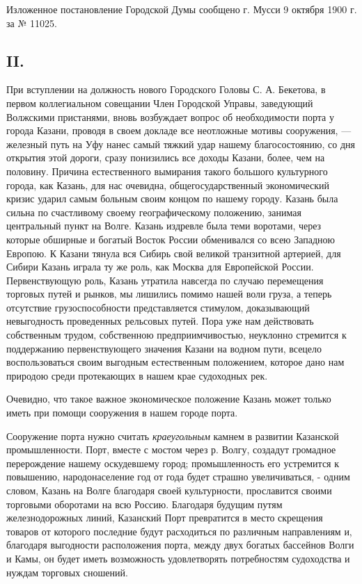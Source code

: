 \documentclass[oneside,final,14pt]{extreport}
\begin{document}
	Изложенное постановление Городской Думы сообщено г. Мусси 9 октября 1900 г. за № 11025.
	
	{%
		\centering
		\subsection*{II.}
	}
	При вступлении на должность нового Городского Головы С. А. Бекетова, в первом коллегиальном совещании Член Городской Управы, заведующий Волжскими пристанями, вновь возбуждает вопрос об необходимости порта у города Казани, проводя в своем докладе все неотложные мотивы сооружения, — железный путь на Уфу нанес самый тяжкий удар нашему благосостоянию, со дня открытия этой дороги, сразу понизились все доходы Казани, более, чем на половину. Причина естественного вымирания такого большого культурного города, как Казань, для нас очевидна, общегосударственный экономический кризис ударил самым больным своим концом по нашему городу. Казань была сильна по счастливому своему географическому положению, занимая центральный пункт на Волге. Казань издревле была теми воротами, через которые обширные и богатый Восток России обменивался со всею Западною Европою. К Казани тянула вся Сибирь свой великой транзитной артерией, для Сибири Казань играла ту же роль, как Москва для Европейской России. Первенствующую роль, Казань утратила навсегда по случаю перемещения торговых путей и рынков, мы лишились помимо нашей воли груза, а теперь отсутствие грузоспособности представляется стимулом, доказывающий невыгодность проведенных рельсовых путей. Пора уже нам действовать собственным трудом, собственною предприимчивостью, неуклонно стремится к поддержанию первенствующего значения Казани на водном пути, всецело воспользоваться своим выгодным естественным положением, которое дано нам природою среди протекающих в нашем крае судоходных рек.
	
	Очевидно, что такое важное экономическое положение Казань может только иметь при помощи сооружения в нашем городе порта.
	
	Сооружение порта нужно считать {\it краеугольным} камнем в развитии Казанской промышленности. Порт, вместе с мостом через р. Волгу, создадут громадное перерождение нашему оскудевшему город; промышленность его устремится к повышению, народонаселение год от года будет страшно увеличиваться, - одним словом, Казань на Волге благодаря своей культурности, прославится своими торговыми оборотами на всю Россию. Благодаря будущим путям железнодорожных линий, Казанский Порт превратится в место скрещения товаров от которого последние будут расходиться по различным направлениям и, благодаря выгодности расположения порта, между двух богатых бассейнов Волги и Камы, он будет иметь возможность удовлетворять потребностям судоходства и нуждам торговых сношений.
	
\end{document}
